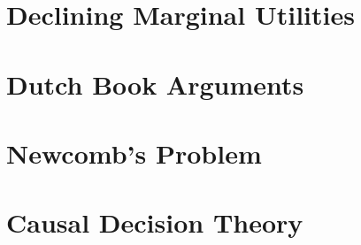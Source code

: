\documentclass[openany]{book}
\begin{document}
%

\chapter{Declining Marginal Utilities}


\chapter{Dutch Book Arguments}


\chapter{Newcomb's Problem}


\chapter{Causal Decision Theory}



%

%

%
%
%
%
%
%
%
%
%
\end{document}

